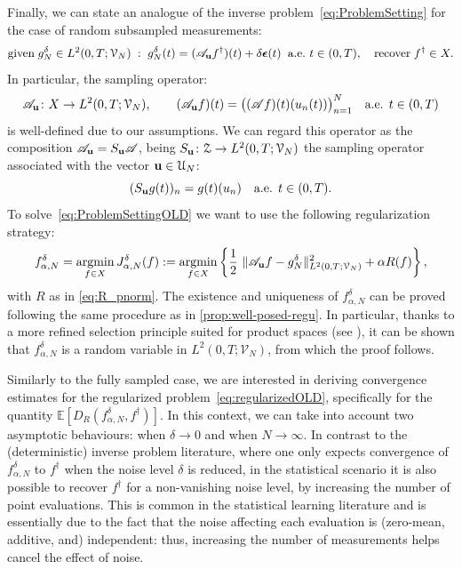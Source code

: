 \documentclass[11pt,a4paper]{article}
\numberwithin{equation}{section}
\DeclareMathOperator*{\argmin}{argmin}
\renewcommand{\vec}[1]{\boldsymbol{#1}} %
\newcommand{\bu}{{\bf u}}
\newcommand{\be}{{\vec{\epsilon}}}
\newcommand{\cAbu}{\mathscr{A}_{\bu}}
\newcommand{\cA}{\mathscr{A}}
\newcommand{\Sbu}{S_{{\bu}}}
\newcommand{\E}{\mathbb{E}}
\def\fdan{f^\delta_{\alpha,N}}
\def\Jdan{J^\delta_{\alpha,N}}
\def\gd{{g}^{\delta}}
\begin{document}
Finally, we can state an analogue of the inverse problem~\eqref{eq:ProblemSetting} for the case of random subsampled measurements:
\begin{equation}\label{eq:ProblemSettingOLD}
\text{given} \; \gd_N \in L^2(0,T;\mathcal{V}_N) \; : \; 
g_N^{\delta}(t) = (\cAbu f^{\dag}) (t) + \delta \be(t) \;\; \text{a.e.}\ t \in (0,T), 
\quad \text{recover} \;  f^{\dag} \in X.
\end{equation}
In particular, the sampling operator:
\[
\cAbu \colon X \rightarrow L^2(0,T;\mathcal{V}_N), \qquad (\cAbu f)(t) = \big((\cA f)(t)(u_n(t))\big)_{n=1}^N \quad \text{a.e. } t \in (0,T)
\]
is well-defined due to our assumptions.
We can regard this operator as the composition $\cAbu = \Sbu \cA$, being $\Sbu\colon \mathcal{Z} \rightarrow L^2(0,T;\mathcal{V}_N)$ the sampling operator associated with the vector $\bu \in \mathcal{U}_N$:
\begin{equation}
    \label{eq:sampling_operator}
    (\Sbu g(t))_n = g(t)(u_n) \quad \text{a.e. } t \in (0,T).
\end{equation}
To solve~\eqref{eq:ProblemSettingOLD} we want to use the following regularization strategy:
\begin{equation}\label{eq:regularizedOLD}
    f_{\alpha,N}^{\delta} = \argmin_{f\in X} \Jdan(f) := \argmin_{f \in X} \left\{
\frac{1}{2} \ \| \cAbu f 
    - g_N^{\delta}\|^2_{L^2(0,T; \mathcal{V}_N)} + \alpha R(f)
\right\},
\end{equation}
with $R$ as in \eqref{eq:R_pnorm}. The existence and uniqueness of $\fdan$ can be proved following the same procedure as in \cref{prop:well-posed-regu}. In particular, thanks to a more refined selection principle suited for product spaces (see \cite[Lemma 6.23]{steinwart2008support}), it can be shown that $\fdan$ is a random variable in $L^2(0,T;\mathcal{V}_N)$, from which the proof follows. 

Similarly to the fully sampled case, we
are interested in deriving convergence estimates for the regularized problem~\eqref{eq:regularizedOLD}, specifically for the quantity $\E[D_R(\fdan,f^\dag)]$. In this context, we can take into account two asymptotic behaviours: when $\delta \rightarrow 0$ and when $N \rightarrow \infty$. In contrast to the (deterministic) inverse problem literature, where one only expects convergence of $\fdan$ to $f^\dag$ when the noise level $\delta$ is reduced, 
in the statistical scenario it is also possible
to recover $f^\dag$ for a non-vanishing noise level, by increasing the number of point evaluations. This is common in the statistical learning literature and is essentially due to the fact that the noise affecting each evaluation is (zero-mean, additive, and) independent: thus, increasing the number of measurements helps cancel the effect of noise. 
\end{document}
